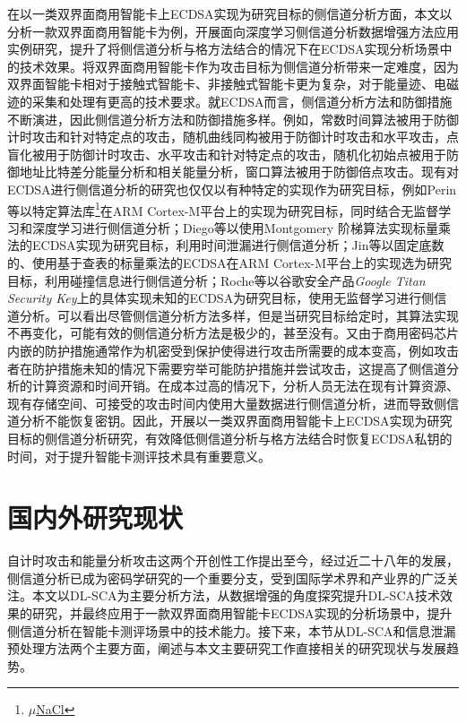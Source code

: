 {	%
	在以一类双界面商用智能卡上ECDSA实现为研究目标的侧信道分析方面，本文以分析一款双界面商用智能卡为例，开展面向深度学习侧信道分析数据增强方法应用实例研究，提升了将侧信道分析与格方法结合的情况下在ECDSA实现分析场景中的技术效果。将双界面商用智能卡作为攻击目标为侧信道分析带来一定难度，因为双界面智能卡相对于接触式智能卡、非接触式智能卡更为复杂，对于能量迹、电磁迹的采集和处理有更高的技术要求。就ECDSA而言，侧信道分析方法和防御措施不断演进，因此侧信道分析方法和防御措施多样。例如，常数时间算法被用于防御计时攻击\citep{Kocher96}和针对特定点的攻击\citep{Sato04}，随机曲线同构\citep{Joye01}被用于防御计时攻击\citep{Kocher96}和水平攻击\citep{Clavier10}，点盲化\citep{Coron99}被用于防御计时攻击\citep{Kocher96}、水平攻击\citep{Clavier10}和针对特定点的攻击\citep{Sato04}，随机化初始点\citep{Mamiya04,Abidalrahman10,Tawalbeh16}被用于防御地址比特差分能量分析\citep{Itoh02}和相关能量分析\citep{Coron99}，窗口算法\citep{Reddy11}被用于防御倍点攻击\citep{Fouque03}。现有对ECDSA进行侧信道分析的研究也仅仅以有种特定的实现作为研究目标，例如Perin等\citep{Perin20}以特定算法库\footnote{\href{http://munacl.cryptojedi.org/curve25519-cortexm0.shtml}{$\mu$NaCl}}在ARM Cortex-M平台上的实现为研究目标，同时结合无监督学习和深度学习进行侧信道分析；Diego等\citep{Diego20}以使用Montgomery 阶梯算法\citep{Cohen05,Blake05}实现标量乘法的ECDSA实现为研究目标，利用时间泄漏进行侧信道分析；Jin等\citep{Jin21}以固定底数的、使用基于查表的标量乘法的ECDSA在ARM Cortex-M平台上的实现选为研究目标，利用碰撞信息进行侧信道分析；Roche等\citep{Roche21}以谷歌安全产品\textit{Google Titan Security Key}\citep{Titan}上的具体实现未知的ECDSA为研究目标，使用无监督学习进行侧信道分析。可以看出尽管侧信道分析方法多样，但是当研究目标给定时，其算法实现不再变化，可能有效的侧信道分析方法是极少的，甚至没有。又由于商用密码芯片内嵌的防护措施通常作为机密受到保护使得进行攻击所需要的成本变高，例如攻击者在防护措施未知的情况下需要穷举可能防护措施并尝试攻击，这提高了侧信道分析的计算资源和时间开销。在成本过高的情况下，分析人员无法在现有计算资源、现有存储空间、可接受的攻击时间内使用大量数据进行侧信道分析，进而导致侧信道分析不能恢复密钥。因此，开展以一类双界面商用智能卡上ECDSA实现为研究目标的侧信道分析研究，有效降低侧信道分析与格方法结合时恢复ECDSA私钥的时间，对于提升智能卡测评技术具有重要意义。
	
	\section{国内外研究现状}
	
	自计时攻击\citep{Kocher96}和能量分析攻击\citep{KocherJJ99}这两个开创性工作提出至今，经过近二十八年的发展，侧信道分析已成为密码学研究的一个重要分支，受到国际学术界和产业界的广泛关注。本文以DL-SCA为主要分析方法，从数据增强的角度探究提升DL-SCA技术效果的研究，并最终应用于一款双界面商用智能卡ECDSA实现的分析场景中，提升侧信道分析在智能卡测评场景中的技术能力。接下来，本节从DL-SCA和信息泄漏预处理方法两个主要方面，阐述与本文主要研究工作直接相关的研究现状与发展趋势。
}
